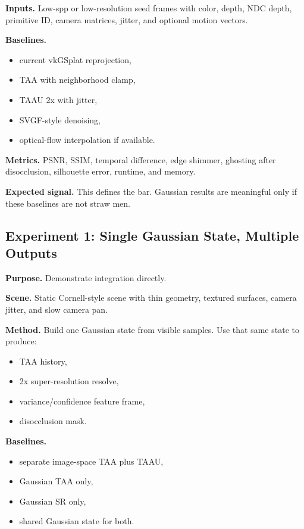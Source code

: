 \documentclass[11pt]{article}
\begin{document}
\textbf{Inputs.} Low-spp or low-resolution seed frames with color, depth, NDC
depth, primitive ID, camera matrices, jitter, and optional motion vectors.

\textbf{Baselines.}

\begin{itemize}
  \item current vkGSplat reprojection,
  \item TAA with neighborhood clamp,
  \item TAAU 2x with jitter,
  \item SVGF-style denoising,
  \item optical-flow interpolation if available.
\end{itemize}

\textbf{Metrics.} PSNR, SSIM, temporal difference, edge shimmer, ghosting after
disocclusion, silhouette error, runtime, and memory.

\textbf{Expected signal.} This defines the bar. Gaussian results are meaningful
only if these baselines are not straw men.

\subsection{Experiment 1: Single Gaussian State, Multiple Outputs}

\textbf{Purpose.} Demonstrate integration directly.

\textbf{Scene.} Static Cornell-style scene with thin geometry, textured
surfaces, camera jitter, and slow camera pan.

\textbf{Method.} Build one Gaussian state from visible samples. Use that same
state to produce:

\begin{itemize}
  \item TAA history,
  \item 2x super-resolution resolve,
  \item variance/confidence feature frame,
  \item disocclusion mask.
\end{itemize}

\textbf{Baselines.}

\begin{itemize}
  \item separate image-space TAA plus TAAU,
  \item Gaussian TAA only,
  \item Gaussian SR only,
  \item shared Gaussian state for both.
\end{itemize}
\end{document}
